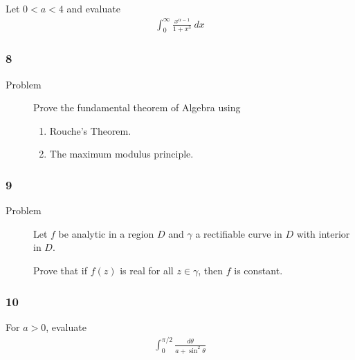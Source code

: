\begin{description}
\tightlist
\item[Problem]
Let \(0<a<4\) and evaluate
\begin{align*}
  \int_0^\infty \frac{x^{\alpha-1}}{1+x^3} ~dx
  \end{align*}
\end{description}

\hypertarget{section-80}{%
\subsubsection{8}\label{section-80}}

\begin{description}
\item[Problem]
Prove the fundamental theorem of Algebra using

\begin{enumerate}
\def\labelenumi{\alph{enumi}.}
\tightlist
\item
  Rouche's Theorem.
\item
  The maximum modulus principle.
\end{enumerate}
\end{description}

\hypertarget{section-81}{%
\subsubsection{9}\label{section-81}}

\begin{description}
\item[Problem]
Let \(f\) be analytic in a region \(D\) and \(\gamma\) a rectifiable
curve in \(D\) with interior in \(D\).

Prove that if \(f(z)\) is real for all \(z\in \gamma\), then \(f\) is
constant.
\end{description}

\hypertarget{section-82}{%
\subsubsection{10}\label{section-82}}

\begin{description}
\tightlist
\item[Problem]
For \(a> 0\), evaluate
\begin{align*}
  \int_0^{\pi/2} \frac{d\theta}{a + \sin^2 \theta}
  \end{align*}
\end{description}

